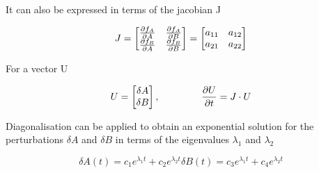 It can also be expressed in terms of the jacobian J

\begin{equation}
    J = \begin{bmatrix}
                              \pdv{f_{A}}{A} &
                              \pdv{f_{A}}{B}  \\
                              \pdv{f_{B}}{A} &
                              \pdv{f_{B}}{B}
    \end{bmatrix}
    = \begin{bmatrix}
          a_{11} &
          a_{12} \\
          a_{21} &
          a_{22}
    \end{bmatrix}
\end{equation}

For a vector U


\begin{subequations}
    \begin{equation}
        U = \begin{bmatrix}
                \delta A  \\
                \delta B
        \end{bmatrix},   \hspace{1.5cm}  \pdv{U}{t} = J \cdot U
    \end{equation}
\end{subequations}




Diagonalisation can be applied to obtain an exponential solution for the perturbations $\delta A$ and $\delta B$ in terms of the eigenvalues $\lambda_{1}$ and $\lambda_{2}$

\begin{subequations}
    \begin{equation}
    \delta A(t) = c_{1}e^{\lambda_{1}t} + c_{2}e^{\lambda_{2}t}
    \end{equation}

    \begin{equation}
        \delta B(t) = c_{3}e^{\lambda_{1}t} + c_{4}e^{\lambda_{2}t}
    \end{equation}
\end{subequations}

